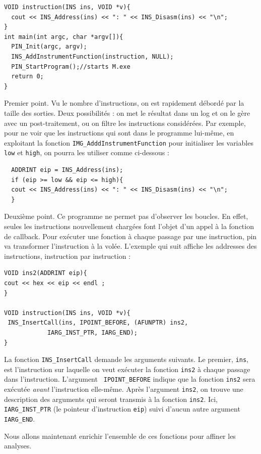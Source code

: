 \documentclass{book}
\newcommand{\code}[1]{\texttt{#1}}
\begin{document}
\begin{verbatim}
VOID instruction(INS ins, VOID *v){
  cout << INS_Address(ins) << ": " << INS_Disasm(ins) << "\n"; 
}
int main(int argc, char *argv[]){
  PIN_Init(argc, argv);
  INS_AddInstrumentFunction(instruction, NULL);
  PIN_StartProgram();//starts M.exe
  return 0;
}
\end{verbatim}

Premier point. Vu le nombre d'instructions, on est rapidement débordé par la taille des sorties. Deux possibilités : on met le résultat dans un log et on le gère avec un post-traitement,  ou on filtre les instructions considérées. Par exemple, pour ne voir que les instructions qui sont dans le programme lui-même, en exploitant la fonction \code{IMG\_AdddInstrumentFunction} pour initialiser les variables \code{low} et \code{high}, on pourra les utiliser comme ci-dessous : 
\begin{verbatim}
  ADDRINT eip = INS_Address(ins);
  if (eip >= low && eip <= high){ 
  cout << INS_Address(ins) << ": " << INS_Disasm(ins) << "\n"; 
  }
\end{verbatim}

Deuxième point. Ce programme ne permet pas d'observer les boucles. En effet, seules les instructions nouvellement chargées font l'objet d'un appel à la fonction de callback. Pour exécuter une fonction à chaque passage par une instruction, {\sc pin} va transformer l'instruction à la volée. L'exemple qui suit affiche les addresses des instructions, instruction par instruction : 

\begin{verbatim}
VOID ins2(ADDRINT eip){
cout << hex << eip << endl ;  
}

VOID instruction(INS ins, VOID *v){
 INS_InsertCall(ins, IPOINT_BEFORE, (AFUNPTR) ins2, 
 			IARG_INST_PTR, IARG_END);
}
\end{verbatim}

La fonction \code{INS\_InsertCall} demande les arguments suivants. Le premier, {\tt ins}, est l'instruction sur laquelle on veut exécuter la fonction \code{ins2} à chaque passage dans l'instruction. L'argument \code{ IPOINT\_BEFORE} indique que la fonction \code{ins2} sera exécutée \emph{avant} l'instruction elle-même. Après l'argument \code{ins2}, on trouve une description des arguments qui seront transmis à la fonction \code{ins2}. Ici, \code{IARG\_INST\_PTR} (le pointeur d'instruction \code{eip}) suivi d'aucun autre argument \code{ IARG\_END}. 

Nous allons maintenant enrichir l'ensemble de ces fonctions pour affiner les analyses. 
\end{document}
